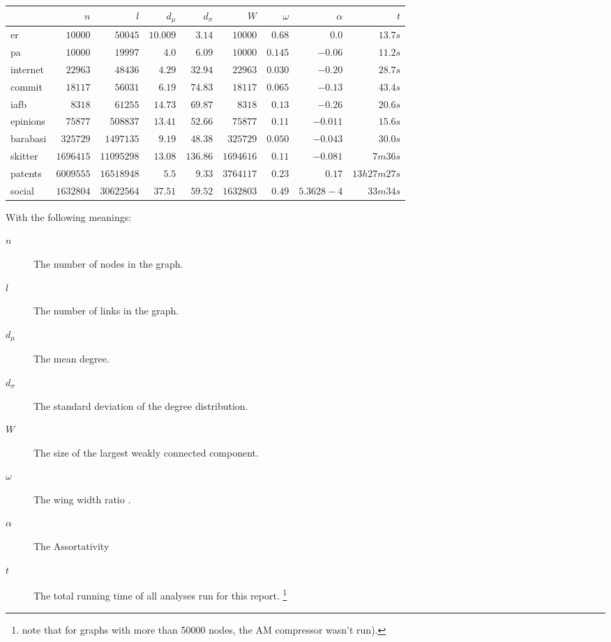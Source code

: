 \documentclass{article}
\begin{document}
\begin{tabular}{|l | r r r r r r r r |}
  \hline                       
  & $n$ & $l$ & $d_\mu$ & $d_\sigma$ & $W$ & $\omega$ & $\alpha$ & $t$ \\ 
  \hline
er  & $10000$ & $50045$ & $10.009$ & $3.14$ & $10000$ & $0.68$ & $0.0$ & $13.7 s$ \\ 
pa  & $10000$ & $19997$ & $4.0$ & $6.09$ & $10000$ & $0.145$ & $-0.06$ & $11.2 s$ \\ 
internet  & $22963$ & $48436$ & $4.29$ & $32.94$ & $22963$ & $0.030$ & $-0.20$ & $28.7 s$ \\ 
commit  & $18117$ & $56031$ & $6.19$ & $74.83$ & $18117$ & $0.065$ & $-0.13$ & $43.4 s$ \\ 
iafb  & $8318$ & $61255$ & $14.73$ & $69.87$ & $8318$ & $0.13$ & $-0.26$ & $20.6 s$ \\ 
epinions  & $75877$ & $508837$ & $13.41$ & $52.66$ & $75877$ & $0.11$ & $-0.011$ & $15.6 s$ \\ 
barabasi  & $325729$ & $1497135$ & $9.19$ & $48.38$ & $325729$ & $0.050$ & $-0.043$ & $30.0 s$ \\ 
skitter  & $1696415$ & $11095298$ & $13.08$ & $136.86$ & $1694616$ & $0.11$ & $-0.081$ & $7m 36 s$ \\ 
patents  & $6009555$ & $16518948$ & $5.5$ & $9.33$ & $3764117$ & $0.23$ & $0.17$ & $13h 27m 27s$ \\ 
social  & $1632804$ & $30622564$ & $37.51$ & $59.52$ & $1632803$ & $0.49$ & $ 5.3628-4 $ & $33m 34s$ \\ 
  \hline  
\end{tabular}

With the following meanings:
\begin{description}
\item[$n$] The number of nodes in the graph.
\item[$l$] The number of links in the graph.
\item[$d_\mu$] The mean degree.
\item[$d_\sigma$] The standard deviation of the degree distribution.
\item[$W$] The size of the largest weakly connected component.
\item[$\omega$] The wing width ratio \cite{kang2011beyond}.
\item[$\alpha$] The Assortativity
\item[$t$] The total running time of all analyses run for this report. \footnote{note that for graphs with more than 50000 nodes, the AM compressor wasn't run).}
\end{description}
\end{document}

